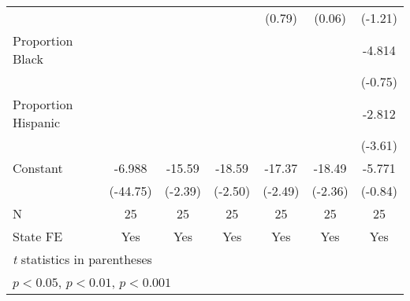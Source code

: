 {\begin{tabular}{l*{6}{c}}
                    &                     &                     &                     &      (0.79)         &      (0.06)         &     (-1.21)         \\
\addlinespace
Proportion Black    &                     &                     &                     &                     &                     &      -4.814         \\
                    &                     &                     &                     &                     &                     &     (-0.75)         \\
\addlinespace
Proportion Hispanic &                     &                     &                     &                     &                     &      -2.812\sym{**} \\
                    &                     &                     &                     &                     &                     &     (-3.61)         \\
\addlinespace
Constant            &      -6.988\sym{***}&      -15.59\sym{*}  &      -18.59\sym{*}  &      -17.37\sym{*}  &      -18.49\sym{*}  &      -5.771         \\
                    &    (-44.75)         &     (-2.39)         &     (-2.50)         &     (-2.49)         &     (-2.36)         &     (-0.84)         \\
\midrule
N                   &          25         &          25         &          25         &          25         &          25         &          25         \\
State FE            &         Yes         &         Yes         &         Yes         &         Yes         &         Yes         &         Yes         \\
\bottomrule
\multicolumn{7}{l}{\footnotesize \textit{t} statistics in parentheses}\\
\multicolumn{7}{l}{\footnotesize \sym{*} \(p<0.05\), \sym{**} \(p<0.01\), \sym{***} \(p<0.001\)}\\
\end{tabular}
}
